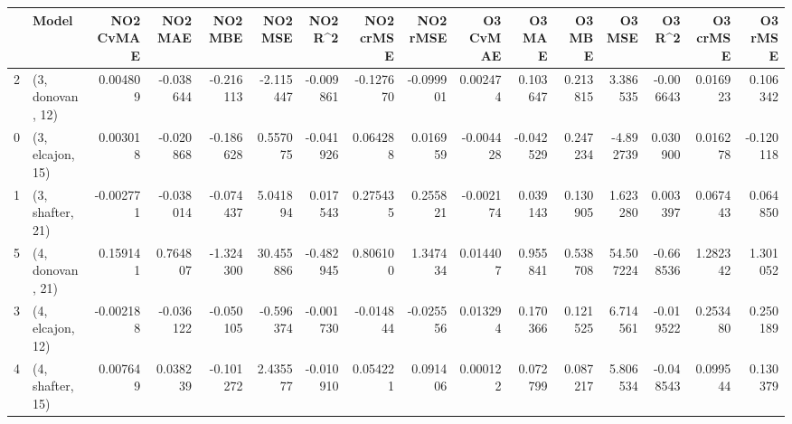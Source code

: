 \begin{tabular}{llrrrrrrrrrrrrrr}
\toprule
{} &             Model &  NO2 CvMAE &   NO2 MAE &   NO2 MBE &    NO2 MSE &   NO2 R\textasciicircum2 &  NO2 crMSE &  NO2 rMSE &  O3 CvMAE &    O3 MAE &    O3 MBE &     O3 MSE &    O3 R\textasciicircum2 &  O3 crMSE &   O3 rMSE \\
\midrule
2 &  (3, donovan, 12) &   0.004809 & -0.038644 & -0.216113 &  -2.115447 & -0.009861 &  -0.127670 & -0.099901 &  0.002474 &  0.103647 &  0.213815 &   3.386535 & -0.006643 &  0.016923 &  0.106342 \\
0 &  (3, elcajon, 15) &   0.003018 & -0.020868 & -0.186628 &   0.557075 & -0.041926 &   0.064288 &  0.016959 & -0.004428 & -0.042529 &  0.247234 &  -4.892739 &  0.030900 &  0.016278 & -0.120118 \\
1 &  (3, shafter, 21) &  -0.002771 & -0.038014 & -0.074437 &   5.041894 &  0.017543 &   0.275435 &  0.255821 & -0.002174 &  0.039143 &  0.130905 &   1.623280 &  0.003397 &  0.067443 &  0.064850 \\
5 &  (4, donovan, 21) &   0.159141 &  0.764807 & -1.324300 &  30.455886 & -0.482945 &   0.806100 &  1.347434 &  0.014407 &  0.955841 &  0.538708 &  54.507224 & -0.668536 &  1.282342 &  1.301052 \\
3 &  (4, elcajon, 12) &  -0.002188 & -0.036122 & -0.050105 &  -0.596374 & -0.001730 &  -0.014844 & -0.025556 &  0.013294 &  0.170366 &  0.121525 &   6.714561 & -0.019522 &  0.253480 &  0.250189 \\
4 &  (4, shafter, 15) &   0.007649 &  0.038239 & -0.101272 &   2.435577 & -0.010910 &   0.054221 &  0.091406 &  0.000122 &  0.072799 &  0.087217 &   5.806534 & -0.048543 &  0.099544 &  0.130379 \\
\bottomrule
\end{tabular}
